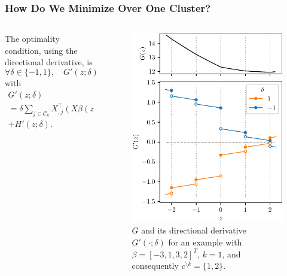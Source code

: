 \begin{frame}
  \frametitle{How Do We Minimize Over One Cluster?}

  \begin{columns}
    \begin{column}{0.45\textwidth}
      The optimality condition, using the directional derivative, is
      \[
        \forall \delta \in \{-1, 1\}, \quad G'(z; \delta) \geq 0,
      \]
      with
      \[
        \begin{multlined}
          G'(z; \delta)  \\= \delta \sum_{j \in \mathcal{C}_k} X_{:j}^\top(X\beta(z) - y) \\
          + H'(z; \delta).
        \end{multlined}
      \]
    \end{column}
    \begin{column}{0.45\textwidth}
      \begin{figure}
        \centering
        \includegraphics[width=\textwidth]{figures/directional-derivative.pdf}
        \caption{%
        \(G\) and its directional derivative \(G'( \cdot ; \delta)\) for
        an example with \(\beta = [-3, 1, 3, 2]^T\), \(k = 1\), and consequently
        \(c^{\setminus k} = \{1, 2\}\).
        }
        \label{fig:}
      \end{figure}
    \end{column}
  \end{columns}
\end{frame}

